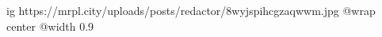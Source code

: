 
 
 
 
 

\ifcmt
  ig https://mrpl.city/uploads/posts/redactor/8wyjspihcgzaqwwm.jpg
  @wrap center
  @width 0.9
\fi
